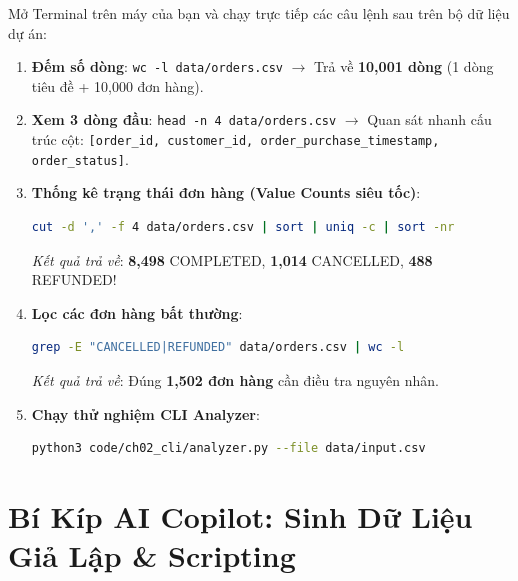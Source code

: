 \begin{handsonlabbox}
Mở Terminal trên máy của bạn và chạy trực tiếp các câu lệnh sau trên bộ dữ liệu dự án:
\begin{enumerate}
    \item \textbf{Đếm số dòng}: \lstinline|wc -l data/orders.csv| $\rightarrow$ Trả về \textbf{10,001 dòng} (1 dòng tiêu đề + 10,000 đơn hàng).
    \item \textbf{Xem 3 dòng đầu}: \lstinline|head -n 4 data/orders.csv| $\rightarrow$ Quan sát nhanh cấu trúc cột: \texttt{[order\_id, customer\_id, order\_purchase\_timestamp, order\_status]}.
    \item \textbf{Thống kê trạng thái đơn hàng (Value Counts siêu tốc)}:
    \begin{lstlisting}[language=bash]
cut -d ',' -f 4 data/orders.csv | sort | uniq -c | sort -nr
    \end{lstlisting}
    \textit{Kết quả trả về}: \textbf{8,498} COMPLETED, \textbf{1,014} CANCELLED, \textbf{488} REFUNDED!
    \item \textbf{Lọc các đơn hàng bất thường}:
    \begin{lstlisting}[language=bash]
grep -E "CANCELLED|REFUNDED" data/orders.csv | wc -l
    \end{lstlisting}
    \textit{Kết quả trả về}: Đúng \textbf{1,502 đơn hàng} cần điều tra nguyên nhân.
    \item \textbf{Chạy thử nghiệm CLI Analyzer}:
    \begin{lstlisting}[language=bash]
python3 code/ch02_cli/analyzer.py --file data/input.csv
    \end{lstlisting}
\end{enumerate}
\end{handsonlabbox}

\section{Bí Kíp AI Copilot: Sinh Dữ Liệu Giả Lập \& Scripting}

